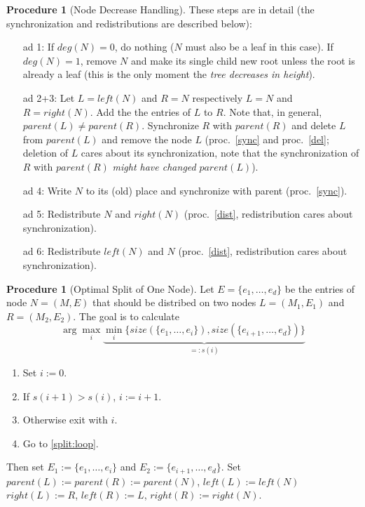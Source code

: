 \documentclass[a4paper, 8pt, twoclumn]{scrartcl}
\theoremstyle{plain}
\theoremstyle{definition}
\newtheorem{proc}[thm]{Procedure}
\theoremstyle{remark}
\begin{document}
\begin{multicols}{2}
\begin{proc}[Node Decrease Handling]
These steps are in detail (the synchronization and redistributions are 
described below):
\begin{itemize}
\item[ad 1:] If \mbox{$deg(N) = 0$}, do nothing ($N$ must also be a leaf in
	this case).
	If \mbox{$deg(N) = 1$}, remove $N$ and make its single child new root
	unless the root is already a leaf (this is the only moment the 
	{\em tree decreases in height}).
\item[ad 2+3:] Let \mbox{$L = left(N)$} and \mbox{$R = N$} respectively
	\mbox{$L = N$} and $R = right(N)$.
	Add the the entries of $L$ to $R$.
	Note that, in general, \mbox{$parent(L) \neq parent(R)$}.
	Synchronize $R$ with $parent(R)$ and delete $L$ from $parent(L)$
	and remove the node $L$ 
	(proc.~\ref{sync} and proc.~\ref{del}; deletion of $L$ cares about its
	synchronization, note that the synchronization of $R$ with $parent(R)$
	{\em might have changed} $parent(L)$).
\item[ad 4:] Write $N$ to its (old) place and synchronize with parent
	(proc.~\ref{sync}).
\item[ad 5:] Redistribute $N$ and $right(N)$ (proc.~\ref{dist},
	redistribution cares about synchronization).
\item[ad 6:] Redistribute $left(N)$ and $N$ (proc.~\ref{dist},
	redistribution cares about synchronization).
\end{itemize}
\end{proc}


\begin{proc}[Optimal Split of One Node] \label{split}
Let \mbox{$E = \{ e_1, \ldots, e_d \}$} be the entries of node
\mbox{$N = (M, E)$} that should be distribed on two nodes 
\mbox{$L = (M_1, E_1)$} and \mbox{$R = (M_2, E_2)$}.
The goal is to calculate
\[ \arg \max_i \underbrace{\min_i \{ size(\{e_1, \ldots, e_i\}),
	size(\{e_{i+1}, \ldots, e_d\}) \}}_{=: s(i)} \]
\begin{enumerate}
\item Set \mbox{$i := 0$}.
\item \label{split:loop} If \mbox{$s(i+1) > s(i)$},  \mbox{$i := i + 1$}. 
\item Otherwise exit with $i$.
\item Go to \ref{split:loop}.
\end{enumerate}
Then set \mbox{$E_1 := \{e_1, \ldots, e_i\}$}
and \mbox{$E_2 := \{e_{i+1}, \ldots, e_d\}$}.
Set \mbox{$parent(L) := parent(R) := parent(N)$}, \mbox{$left(L) := left(N)$}
\mbox{$right(L) := R$}, \mbox{$left(R) := L$}, \mbox{$right(R) := right(N)$}.


\end{proc}
\end{multicols}
\end{document}
